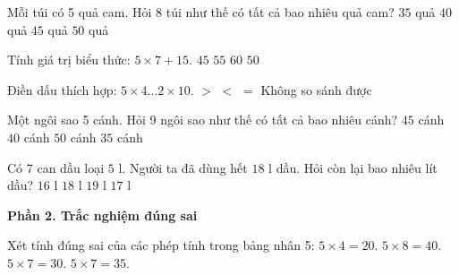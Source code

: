 \begin{ex} %
Mỗi túi có 5 quả cam. Hỏi 8 túi như thế có tất cả bao nhiêu quả cam?
\choice
{$35$ quả}
{\True $40$ quả}
{$45$ quả}
{$50$ quả}
\end{ex}

\begin{ex} %
Tính giá trị biểu thức: $5 \times 7 + 15$.
\choice
{$45$}
{$55$}
{$60$}
{\True $50$}
\end{ex}

\begin{ex} %
Điền dấu thích hợp: $5 \times 4 \dots 2 \times 10$.
\choice
{$>$}
{$<$}
{\True $=$}
{Không so sánh được}
\end{ex}

\begin{ex} %
Một ngôi sao 5 cánh. Hỏi 9 ngôi sao như thế có tất cả bao nhiêu cánh?
\choice
{\True $45$ cánh}
{$40$ cánh}
{$50$ cánh}
{$35$ cánh}
\end{ex}

\begin{ex} %
Có 7 can dầu loại $5\text{ l}$. Người ta đã dùng hết $18\text{ l}$ dầu. Hỏi còn lại bao nhiêu lít dầu?
\choice
{$16\text{ l}$}
{$18\text{ l}$}
{$19\text{ l}$}
{\True $17\text{ l}$}
\end{ex}

\textbf{Phần 2. Trắc nghiệm đúng sai}

\begin{ex} %
Xét tính đúng sai của các phép tính trong bảng nhân 5:
\choiceTF
{\True $5 \times 4 = 20$.}
{\True $5 \times 8 = 40$.}
{$5 \times 7 = 30$.}
{\True $5 \times 7 = 35$.}
\end{ex}


